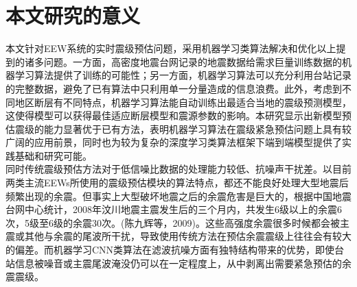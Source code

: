 \section{本文研究的意义}
\indent 本文针对EEW系统的实时震级预估问题，采用机器学习类算法解决和优化以上提到的诸多问题。一方面，高密度地震台网记录的地震数据给需求巨量训练数据的机器学习算法提供了训练的可能性；另一方面，机器学习算法可以充分利用台站记录的完整数据，避免了已有算法中只利用单一分量造成的信息浪费。此外，考虑到不同地区断层有不同特点，机器学习算法能自动训练出最适合当地的震级预测模型，这使得模型可以获得最佳适应断层模型和震源参数的影响。本研究显示出新模型预估震级的能力显著优于已有方法，表明机器学习算法在震级紧急预估问题上具有较广阔的应用前景，同时也为较为复杂的深度学习类算法框架下端到端模型提供了实践基础和研究可能。\\
\indent 同时传统震级预估方法对于低信噪比数据的处理能力较低、抗噪声干扰差。以目前两类主流EEWs所使用的震级预估模块的算法特点，都还不能良好处理大型地震后频繁出现的余震。但事实上大型破坏地震之后的余震危害是巨大的，根据中国地震台网中心统计，2008年汶川地震主震发生后的三个月内，共发生6级以上的余震6次，5级至6级的余震30次。(陈九辉等，2009)。这些高强度余震很多时候都会被主震或其他与余震的尾波所干扰，导致使用传统方法在预估余震震级上往往会有较大的偏差。而机器学习CNN类算法在滤波抗噪方面有独特结构带来的优势，即使台站信息被噪音或主震尾波淹没仍可以在一定程度上，从中剥离出需要紧急预估的余震震级。\\